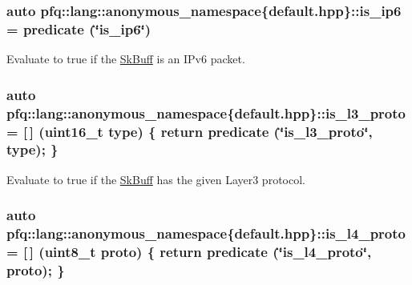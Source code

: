 \subsubsection[{\texorpdfstring{is\+\_\+ip6}{is_ip6}}]{\setlength{\rightskip}{0pt plus 5cm}auto pfq\+::lang\+::anonymous\+\_\+namespace\{default.\+hpp\}\+::is\+\_\+ip6 = {\bf predicate} (\char`\"{}is\+\_\+ip6\char`\"{})}\hypertarget{namespacepfq_1_1lang_1_1anonymous__namespace_02default_8hpp_03_a5fa35e94e399b76838b7be894d85b83c}{}\label{namespacepfq_1_1lang_1_1anonymous__namespace_02default_8hpp_03_a5fa35e94e399b76838b7be894d85b83c}


Evaluate to {\ttfamily true} if the \hyperlink{structpfq_1_1lang_1_1SkBuff}{Sk\+Buff} is an I\+Pv6 packet. 

\subsubsection[{\texorpdfstring{is\+\_\+l3\+\_\+proto}{is_l3_proto}}]{\setlength{\rightskip}{0pt plus 5cm}auto pfq\+::lang\+::anonymous\+\_\+namespace\{default.\+hpp\}\+::is\+\_\+l3\+\_\+proto = \mbox{[}$\,$\mbox{]} (uint16\+\_\+t type) \{ return {\bf predicate} (\char`\"{}is\+\_\+l3\+\_\+proto\char`\"{}, type); \}}\hypertarget{namespacepfq_1_1lang_1_1anonymous__namespace_02default_8hpp_03_a814bb9c3c833dc2af342d695b1d503e8}{}\label{namespacepfq_1_1lang_1_1anonymous__namespace_02default_8hpp_03_a814bb9c3c833dc2af342d695b1d503e8}


Evaluate to {\ttfamily true} if the \hyperlink{structpfq_1_1lang_1_1SkBuff}{Sk\+Buff} has the given Layer3 protocol. 

\subsubsection[{\texorpdfstring{is\+\_\+l4\+\_\+proto}{is_l4_proto}}]{\setlength{\rightskip}{0pt plus 5cm}auto pfq\+::lang\+::anonymous\+\_\+namespace\{default.\+hpp\}\+::is\+\_\+l4\+\_\+proto = \mbox{[}$\,$\mbox{]} (uint8\+\_\+t proto) \{ return {\bf predicate} (\char`\"{}is\+\_\+l4\+\_\+proto\char`\"{}, proto); \}}\hypertarget{namespacepfq_1_1lang_1_1anonymous__namespace_02default_8hpp_03_a9d06d4dedca1ebdc3b270cb2f3e9e42b}{}\label{namespacepfq_1_1lang_1_1anonymous__namespace_02default_8hpp_03_a9d06d4dedca1ebdc3b270cb2f3e9e42b}


